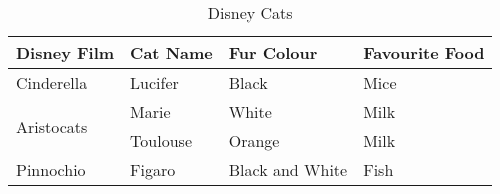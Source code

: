 \documentclass[10pt,a4paper]{article}
\begin{document}
\begin{table}[ht]
\begin{center}
\begin{tabular}{ p{90pt} | p{90pt} | p{90pt} | p{90pt}} 
Disney Film 				& Cat Name 	& Fur Colour 		& Favourite Food	\\ \hline
Cinderella 				& Lucifer 		& Black 			& Mice 			\\ \hline
\multirow{2}{*}{Aristocats} 	& Marie 		& White 			& Milk			\\\cline{2-4}
						& Toulouse 	& Orange 			& Milk			\\ \hline
Pinnochio 					& Figaro	 	& Black and White 	& Fish 			\\ \hline
\end{tabular}
\caption{Disney Cats}
\end{center}
\end{table}
\end{document}
